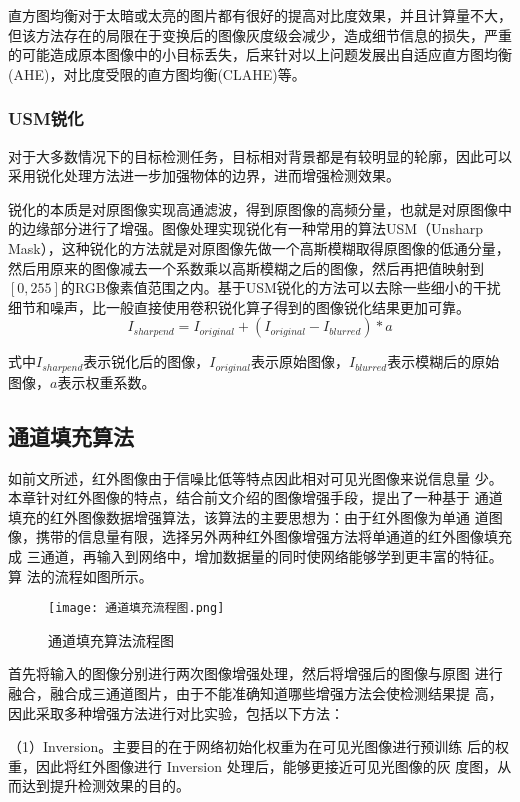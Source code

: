 直方图均衡对于太暗或太亮的图片都有很好的提高对比度效果，并且计算量不大，但该方法存在的局限在于变换后的图像灰度级会减少，造成细节信息的损失，严重的可能造成原本图像中的小目标丢失，后来针对以上问题发展出自适应直方图均衡(AHE)，对比度受限的直方图均衡(CLAHE)等。

\subsubsection{USM锐化}
对于大多数情况下的目标检测任务，目标相对背景都是有较明显的轮廓，因此可以采用锐化处理方法进一步加强物体的边界，进而增强检测效果。

锐化的本质是对原图像实现高通滤波，得到原图像的高频分量，也就是对原图像中的边缘部分进行了增强。图像处理实现锐化有一种常用的算法USM（Unsharp Mask），这种锐化的方法就是对原图像先做一个高斯模糊取得原图像的低通分量，然后用原来的图像减去一个系数乘以高斯模糊之后的图像，然后再把值映射到$[0,255]$的RGB像素值范围之内。基于USM锐化的方法可以去除一些细小的干扰细节和噪声，比一般直接使用卷积锐化算子得到的图像锐化结果更加可靠。
\begin{equation}
  I_{sharpend}=I_{original}+(I_{original}-I_{blurred})*a
\end{equation}

式中$I_{sharpend}$表示锐化后的图像，$I_{original}$表示原始图像，$I_{blurred}$表示模糊后的原始图像，$a$表示权重系数。

\subsection{通道填充算法}
如前文所述，红外图像由于信噪比低等特点因此相对可见光图像来说信息量
少。本章针对红外图像的特点，结合前文介绍的图像增强手段，提出了一种基于
通道填充的红外图像数据增强算法，该算法的主要思想为：由于红外图像为单通
道图像，携带的信息量有限，选择另外两种红外图像增强方法将单通道的红外图像填充成
三通道，再输入到网络中，增加数据量的同时使网络能够学到更丰富的特征。算
法的流程如图所示。

\begin{figure}[h]
  \centering
  \texttt{[image: 通道填充流程图.png]}
  \caption{通道填充算法流程图}
  \label{tdtc}
\end{figure}

首先将输入的图像分别进行两次图像增强处理，然后将增强后的图像与原图
进行融合，融合成三通道图片，由于不能准确知道哪些增强方法会使检测结果提
高，因此采取多种增强方法进行对比实验，包括以下方法：

（1）Inversion。主要目的在于网络初始化权重为在可见光图像进行预训练
后的权重，因此将红外图像进行 Inversion 处理后，能够更接近可见光图像的灰
度图，从而达到提升检测效果的目的。

